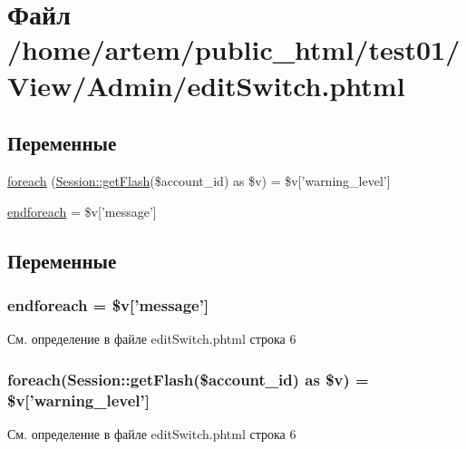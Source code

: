 \hypertarget{edit_switch_8phtml}{\section{Файл /home/artem/public\-\_\-html/test01/\-View/\-Admin/edit\-Switch.phtml}
\label{edit_switch_8phtml}
}
\subsection*{Переменные}
\begin{DoxyCompactItemize}
\item 
\hyperlink{edit_switch_8phtml_a1c191ff1be2612f80eabc75951f1841b}{foreach} (\hyperlink{class_session_ae4c4b98671bdd1fbfe4ae9defb5405ad}{Session\-::get\-Flash}(\$account\-\_\-id) as \$v) = \$v\mbox{[}'warning\-\_\-level'\mbox{]}
\item 
\hyperlink{edit_switch_8phtml_a672d9707ef91db026c210f98cc601123}{endforeach} = \$v\mbox{[}'message'\mbox{]}
\end{DoxyCompactItemize}


\subsection{Переменные}
\hypertarget{edit_switch_8phtml_a672d9707ef91db026c210f98cc601123}{
\subsubsection[{endforeach}]{\setlength{\rightskip}{0pt plus 5cm}endforeach = \$v\mbox{[}'message'\mbox{]}}}\label{edit_switch_8phtml_a672d9707ef91db026c210f98cc601123}


См. определение в файле edit\-Switch.\-phtml строка 6

\hypertarget{edit_switch_8phtml_a1c191ff1be2612f80eabc75951f1841b}{
\subsubsection[{foreach}]{\setlength{\rightskip}{0pt plus 5cm}foreach({\bf Session\-::get\-Flash}(\$account\-\_\-id) as \$v) = \$v\mbox{[}'warning\-\_\-level'\mbox{]}}}\label{edit_switch_8phtml_a1c191ff1be2612f80eabc75951f1841b}


См. определение в файле edit\-Switch.\-phtml строка 6

